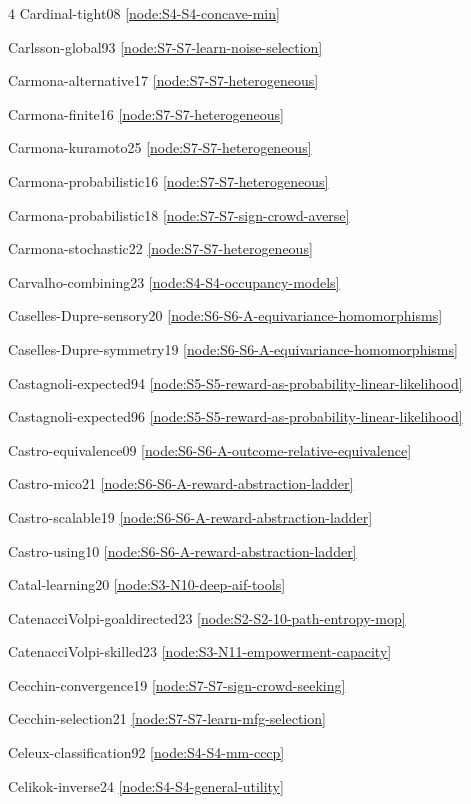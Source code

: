 \documentclass[10pt]{article}
\begin{document}
{\begin{multicols}{4}
Cardinal-tight08 \hfill \ref{node:S4-S4-concave-min}\par
Carlsson-global93 \hfill \ref{node:S7-S7-learn-noise-selection}\par
Carmona-alternative17 \hfill \ref{node:S7-S7-heterogeneous}\par
Carmona-finite16 \hfill \ref{node:S7-S7-heterogeneous}\par
Carmona-kuramoto25 \hfill \ref{node:S7-S7-heterogeneous}\par
Carmona-probabilistic16 \hfill \ref{node:S7-S7-heterogeneous}\par
Carmona-probabilistic18 \hfill \ref{node:S7-S7-sign-crowd-averse}\par
Carmona-stochastic22 \hfill \ref{node:S7-S7-heterogeneous}\par
Carvalho-combining23 \hfill \ref{node:S4-S4-occupancy-models}\par
Caselles-Dupre-sensory20 \hfill \ref{node:S6-S6-A-equivariance-homomorphisms}\par
Caselles-Dupre-symmetry19 \hfill \ref{node:S6-S6-A-equivariance-homomorphisms}\par
Castagnoli-expected94 \hfill \ref{node:S5-S5-reward-as-probability-linear-likelihood}\par
Castagnoli-expected96 \hfill \ref{node:S5-S5-reward-as-probability-linear-likelihood}\par
Castro-equivalence09 \hfill \ref{node:S6-S6-A-outcome-relative-equivalence}\par
Castro-mico21 \hfill \ref{node:S6-S6-A-reward-abstraction-ladder}\par
Castro-scalable19 \hfill \ref{node:S6-S6-A-reward-abstraction-ladder}\par
Castro-using10 \hfill \ref{node:S6-S6-A-reward-abstraction-ladder}\par
Catal-learning20 \hfill \ref{node:S3-N10-deep-aif-tools}\par
CatenacciVolpi-goaldirected23 \hfill \ref{node:S2-S2-10-path-entropy-mop}\par
CatenacciVolpi-skilled23 \hfill \ref{node:S3-N11-empowerment-capacity}\par
Cecchin-convergence19 \hfill \ref{node:S7-S7-sign-crowd-seeking}\par
Cecchin-selection21 \hfill \ref{node:S7-S7-learn-mfg-selection}\par
Celeux-classification92 \hfill \ref{node:S4-S4-mm-cccp}\par
Celikok-inverse24 \hfill \ref{node:S4-S4-general-utility}\par

\end{multicols}}
\end{document}
